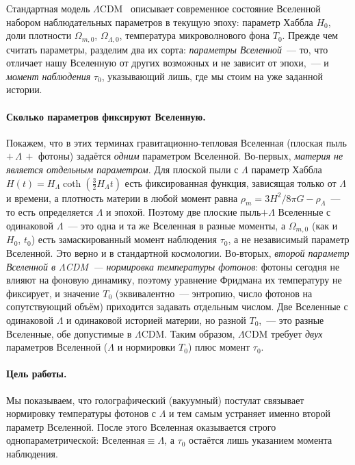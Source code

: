 \documentclass[12pt,a4paper]{article}
\begin{document}
Стандартная модель $\Lambda$CDM~\cite{Planck2018} описывает современное состояние Вселенной набором наблюдательных параметров в текущую эпоху: параметр Хаббла $H_0$, доли плотности $\Omega_{m,0}$, $\Omega_{\Lambda,0}$, температура микроволнового фона $T_0$. Прежде чем считать параметры, разделим два их сорта: \emph{параметры Вселенной}~--- то, что отличает нашу Вселенную от других возможных и не зависит от эпохи,~--- и \emph{момент наблюдения} $\tau_0$, указывающий лишь, где мы стоим на уже заданной истории.

\paragraph{Сколько параметров фиксируют Вселенную.} Покажем, что в этих терминах гравитационно-тепловая Вселенная (плоская пыль $+\,\Lambda\,+$ фотоны) задаётся \emph{одним} параметром Вселенной. Во-первых, \emph{материя не является отдельным параметром}. Для плоской пыли с $\Lambda$ параметр Хаббла $H(t)=H_\Lambda\coth(\tfrac{3}{2}H_\Lambda t)$ есть фиксированная функция, зависящая только от $\Lambda$ и времени, а плотность материи в любой момент равна $\rho_m=3H^2/8\pi G-\rho_\Lambda$~--- то есть определяется $\Lambda$ и эпохой. Поэтому две плоские пыль$+\Lambda$ Вселенные с одинаковой $\Lambda$~--- это одна и та же Вселенная в разные моменты, а $\Omega_{m,0}$ (как и $H_0$, $t_0$) есть замаскированный момент наблюдения $\tau_0$, а не независимый параметр Вселенной. Это верно и в стандартной космологии. Во-вторых, \emph{второй параметр Вселенной в $\Lambda$CDM~--- нормировка температуры фотонов}: фотоны сегодня не влияют на фоновую динамику, поэтому уравнение Фридмана их температуру не фиксирует, и значение $T_0$ (эквивалентно~--- энтропию, число фотонов на сопутствующий объём) приходится задавать отдельным числом. Две Вселенные с одинаковой $\Lambda$ и одинаковой историей материи, но разной $T_0$,~--- это разные Вселенные, обе допустимые в $\Lambda$CDM. Таким образом, $\Lambda$CDM требует \emph{двух} параметров Вселенной ($\Lambda$ и нормировки $T_0$) плюс момент $\tau_0$.

\paragraph{Цель работы.} Мы показываем, что голографический (вакуумный) постулат связывает нормировку температуры фотонов с $\Lambda$ и тем самым устраняет именно второй параметр Вселенной. После этого Вселенная оказывается строго однопараметрической: $\text{Вселенная}\equiv\Lambda$, а $\tau_0$ остаётся лишь указанием момента наблюдения.
\end{document}
